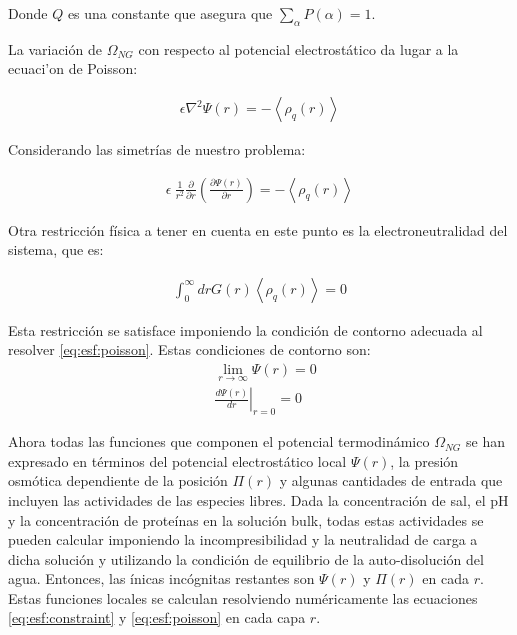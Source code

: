 \noindent Donde $Q$ es una constante que asegura que $\sum_\alpha P(\alpha) = 1$.


La variaci\'on de $\Omega_{NG}$ con respecto al potencial electrost\'atico da lugar a la ecuaci'on de Poisson:

\begin{align}
	\epsilon\nabla^2\Psi(r) = -\left<\rho_q(r)\right>
\end{align}

Considerando las simetr\'ias de nuestro problema:

\begin{align}
	\epsilon ~ \frac{1}{r^2} \frac{\partial}{\partial r}\left(\frac{\partial \Psi(r)}{\partial r}\right) = -\left<\rho_q(r)\right>
	\label{eq:esf:poisson}
\end{align}

Otra restricci\'on f\'isica a tener en cuenta en este punto es la electroneutralidad del sistema, que es:

\begin{align}
	\int_0^\infty{drG(r) \left<\rho_q(r)\right>} = 0
\end{align}

Esta restricci\'on se satisface imponiendo la condici\'on de contorno adecuada al resolver \ref{eq:esf:poisson}. Estas condiciones de contorno son:
\begin{align}
	&  \lim_{r\to\infty}\Psi(r) = 0 \\
	&  \left.\frac{d\Psi(r)}{dr}\right|_{r=0} = 0
	\label{eq:esf:contorno}
	\end{align}
	

Ahora todas las funciones que componen el potencial termodin\'amico $\Omega_{NG}$ se han expresado en t\'erminos del potencial electrost\'atico local $\Psi(r)$, la presi\'on osm\'otica dependiente de la posici\'on $\Pi(r)$ y algunas cantidades de entrada que incluyen las actividades de las especies libres.
Dada la concentraci\'on de sal, el pH y la concentraci\'on de prote\'inas en la soluci\'on bulk, todas estas actividades se pueden calcular imponiendo la incompresibilidad y la neutralidad de carga a dicha soluci\'on y utilizando la condici\'on de equilibrio de la auto-disoluci\'on del agua.
Entonces, las \'inicas inc\'ognitas restantes son $\Psi(r)$ y $\Pi(r)$ en cada $r$.
Estas funciones locales se calculan resolviendo num\'ericamente las ecuaciones \ref{eq:esf:constraint} y \ref{eq:esf:poisson} en cada capa $r$.
 

